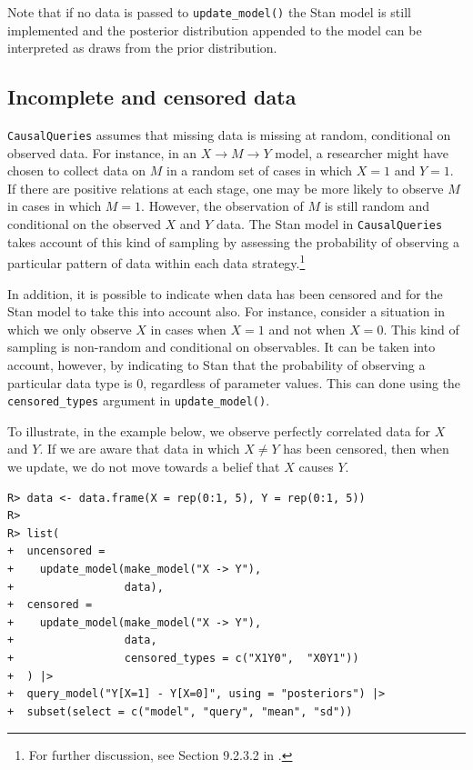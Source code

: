 \documentclass[
  11pt,
  article]{jss}
\begin{document}
Note that if no data is passed to \texttt{update\_model()} the Stan
model is still implemented and the posterior distribution appended to
the model can be interpreted as draws from the prior distribution.

\subsection{Incomplete and censored
data}\label{incomplete-and-censored-data}

\texttt{CausalQueries} assumes that missing data is missing at random,
conditional on observed data. For instance, in an
\(X \rightarrow M \rightarrow Y\) model, a researcher might have chosen
to collect data on \(M\) in a random set of cases in which \(X=1\) and
\(Y=1\). If there are positive relations at each stage, one may be more
likely to observe \(M\) in cases in which \(M=1\). However, the
observation of \(M\) is still random and conditional on the observed
\(X\) and \(Y\) data. The Stan model in \texttt{CausalQueries} takes
account of this kind of sampling by assessing the probability of
observing a particular pattern of data within each data
strategy.\footnote{For further discussion, see Section 9.2.3.2 in
  \citet{humphreys_integrated_2023}.}

In addition, it is possible to indicate when data has been censored and
for the Stan model to take this into account also. For instance,
consider a situation in which we only observe \(X\) in cases when
\(X=1\) and not when \(X=0\). This kind of sampling is non-random and
conditional on observables. It can be taken into account, however, by
indicating to Stan that the probability of observing a particular data
type is \(0\), regardless of parameter values. This can done using the
\texttt{censored\_types} argument in \texttt{update\_model()}.

To illustrate, in the example below, we observe perfectly correlated
data for \(X\) and \(Y\). If we are aware that data in which
\(X \neq Y\) has been censored, then when we update, we do not move
towards a belief that \(X\) causes \(Y\).

\begin{verbatim}
R> data <- data.frame(X = rep(0:1, 5), Y = rep(0:1, 5))
R> 
R> list(
+  uncensored = 
+    update_model(make_model("X -> Y"),
+                 data),
+  censored = 
+    update_model(make_model("X -> Y"), 
+                 data, 
+                 censored_types = c("X1Y0",  "X0Y1"))
+  ) |>
+  query_model("Y[X=1] - Y[X=0]", using = "posteriors") |> 
+  subset(select = c("model", "query", "mean", "sd"))
\end{verbatim}
\end{document}
